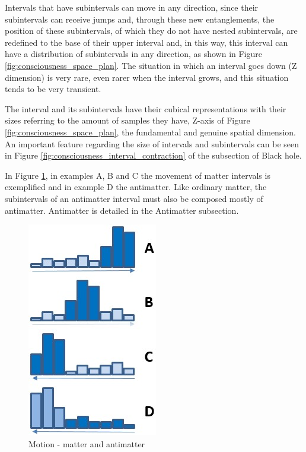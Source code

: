 Intervals that have subintervals can move in any direction, since their subintervals can receive jumps and, through these new entanglements, the position of these subintervals, of which they do not have nested subintervals, are redefined to the base of their upper interval and, in this way, this interval can have a distribution of subintervals in any direction, as shown in Figure \ref{fig:consciousness_space_plan}. The situation in which an interval goes down (Z dimension) is very rare, even rarer when the interval grows, and this situation tends to be very transient.

The interval and its subintervals have their cubical representations with their sizes referring to the amount of samples they have, Z-axis of Figure \ref{fig:consciousness_space_plan}, the fundamental and genuine spatial dimension. An important feature regarding the size of intervals and subintervals can be seen in Figure \ref{fig:consciousness_interval_contraction} of the subsection of Black hole.

In Figure \ref{fig:consciousness_space_matter_antimatter}, in examples A, B and C the movement of matter intervals is exemplified and in example D the antimatter. Like ordinary matter, the subintervals of an antimatter interval must also be composed mostly of antimatter. Antimatter is detailed in the Antimatter subsection.
	\begin{figure}[H]
	\caption{Motion - matter and antimatter}
	\label{fig:consciousness_space_matter_antimatter}
	\centering
	\includegraphics[scale=.7]{sections/images/consciousness_space_matter_antimatter.jpg}
	\end{figure}

